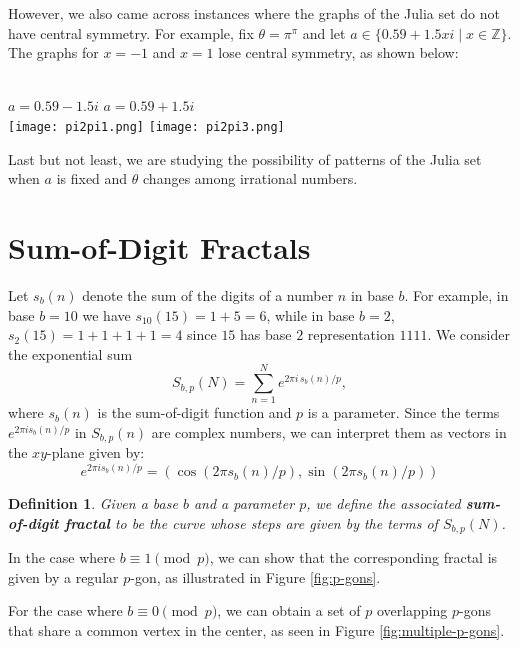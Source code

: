 \documentclass[12pt]{article}
\newtheorem*{defn}{Definition}
\begin{document}
However, we also came across instances where the graphs of the Julia set do not have central symmetry. For example, fix $\theta = \pi^\pi$ and let $a \in \{0.59+1.5xi \mid x \in \mathbb{Z}\}$. The graphs for $x=-1$ and $x=1$  lose central symmetry, as shown below:
\begin{center}
    ~\\$a=0.59-1.5i$ \hspace{1.25in}$a=0.59+1.5i$ 
    ~\\\texttt{[image: pi2pi1.png]}
    \hspace{1in}
    \texttt{[image: pi2pi3.png]} 
\end{center}

Last but not least, we are studying the possibility of patterns of the Julia set when ${a}$ is fixed and ${\theta}$ changes among irrational numbers.

\section{Sum-of-Digit Fractals}
Let  $s_{b}(n)$ denote the sum of the digits of a number $n$ in base $b$.
For example, in base $b=10$ we have 
$s_{10}(15) = 1 + 5 = 6$, while in base $b=2$,
 $s_{2}(15) =  1 + 1 + 1+ 1 = 4$ since $15$ has base $2$ representation $1111$.
 We consider the exponential sum
\[ S_{b, p}(N) = \sum_{n=1}^{N}{e^{2\pi i\, s_{b}(n)/p}},
\]
where $s_b(n)$ is the sum-of-digit function and $p$ is a parameter.
Since the terms $e^{2\pi i s_b(n)/p}$ in $S_{b,p}(n)$ are complex numbers, we can interpret them as vectors in the $xy$-plane given by:
\[
e^{2\pi i s_b(n)/p}=(\cos(2\pi  s_{b}(n)/p), \sin(2\pi s_{b}(n)/p))
\]

\begin{defn}Given a base $b$ and a parameter $p$, we define the associated \textbf{sum-of-digit fractal} to be the  curve whose steps are given by the terms of $S_{b,p}(N)$.
\end{defn}

In the case where $b \equiv 1 \pmod{p}$, we can show that the corresponding fractal is given by a regular $p$-gon, as illustrated in Figure \ref{fig:p-gons}.

For the case where $b \equiv 0 \pmod{p}$, we can obtain a set of $p$ overlapping $p$-gons that share a common vertex in the center, as seen in Figure \ref{fig:multiple-p-gons}.
\end{document}
